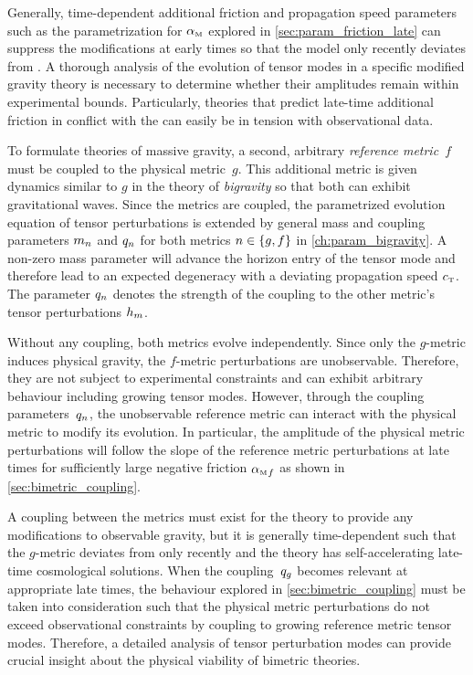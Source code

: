 \documentclass[12pt,parskip=half]{scrreprt}
\begin{document}
Generally, time-dependent additional friction and propagation speed parameters such as the parametrization for \({\alpha_{\textnormal{\tiny{M}}}}\) explored in \autoref{sec:param_friction_late} can suppress the modifications at early times so that the model only recently deviates from \LCDM. A thorough analysis of the evolution of tensor modes in a specific modified gravity theory is necessary to determine whether their amplitudes remain within experimental bounds. Particularly, theories that predict late-time additional friction in conflict with the  can easily be in tension with observational data.

To formulate theories of massive gravity, a second, arbitrary \emph{reference metric}~\(f\) must be coupled to the physical metric~\(g\). This additional metric is given dynamics similar to \(g\) in the theory of \emph{bigravity} so that both can exhibit gravitational waves. Since the metrics are coupled, the parametrized evolution equation of tensor perturbations is extended by general mass and coupling parameters \(m_{n}\) and \(q_{n}\) for both metrics \(n \in \cbr{g,f}\) in \autoref{ch:param_bigravity}. A non-zero mass parameter will advance the horizon entry of the tensor mode and therefore lead to an expected degeneracy with a deviating propagation speed \({c_{\textnormal{\tiny{T}}}}\). The parameter \(q_{n}\) denotes the strength of the coupling to the other metric's tensor perturbations \(h_{m}\).

Without any coupling, both metrics evolve independently. Since only the \(g\)-metric induces physical gravity, the \(f\)-metric perturbations are unobservable. Therefore, they are not subject to experimental constraints and can exhibit arbitrary behaviour including growing tensor modes. However, through the coupling parameters~\(q_{n}\), the unobservable reference metric can interact with the physical metric to modify its evolution. In particular, the amplitude of the physical metric perturbations will follow the slope of the reference metric perturbations at late times for sufficiently large negative friction \({\alpha_{\textnormal{\tiny{M}}}}_{f}\) as shown in \autoref{sec:bimetric_coupling}.

A coupling between the metrics must exist for the theory to provide any modifications to observable gravity, but it is generally time-dependent such that the \(g\)-metric deviates from \LCDM only recently and the theory has self-accelerating late-time cosmological solutions. When the coupling~\(q_{g}\) becomes relevant at appropriate late times,  the behaviour explored in \autoref{sec:bimetric_coupling} must be taken into consideration such that the physical metric perturbations do not exceed observational constraints by coupling to growing reference metric tensor modes. Therefore, a detailed analysis of tensor perturbation modes can provide crucial insight about the physical viability of bimetric theories.
\end{document}
